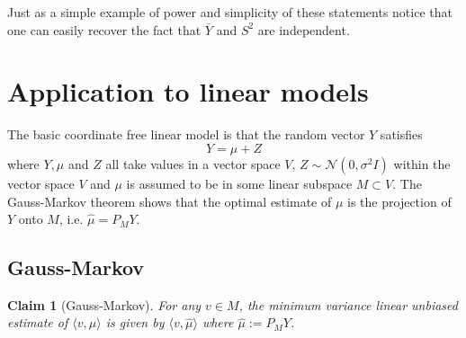 \documentclass[11pt]{report}
\newtheorem{claim}{Claim}
\begin{document}
Just as a simple example of power and simplicity of these statements notice that one can easily recover the fact that $\overline Y$ and $S^2$ are independent.



\section{Application to linear models}

The basic coordinate free linear model is that the random vector $Y$ satisfies
\[
Y = \mu + Z
\]
where $Y, \mu$ and $Z$ all take values in a vector space $V$, $Z\sim \mathcal N(0,\sigma^2I)$ within the vector space $V$ and $\mu$ is assumed to be in some linear subspace $M\subset V$. The Gauss-Markov theorem shows that the optimal estimate of $\mu$ is the projection of $Y$ onto $M$, i.e. $\hat\mu = P_M Y$. 

\subsection{Gauss-Markov}
\begin{claim}[Gauss-Markov]
For any $v\in M$, the minimum variance linear unbiased estimate of $\langle v,\mu\rangle$ is given by $\langle v,\hat\mu\rangle$ where $\hat\mu := P_M Y$. 
\end{claim}
\end{document}
